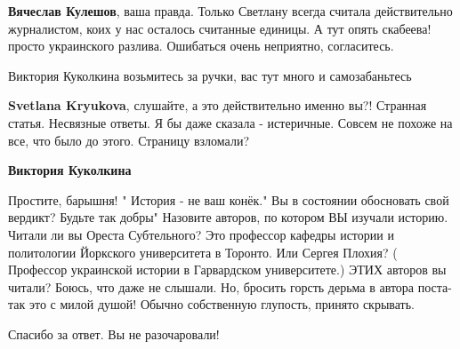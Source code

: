 \begin{itemize}
\begin{itemize}
\textbf{Вячеслав Кулешов}, ваша правда. Только Светлану всегда считала действительно журналистом, коих у нас осталось считанные единицы. А тут опять скабеева! просто украинского разлива. Ошибаться очень неприятно, согласитесь.


 
Виктория Куколкина возьмитесь за ручки, вас тут много и самозабаньтесь

 
\textbf{Svetlana Kryukova}, слушайте, а это действительно именно вы?! Странная статья. Несвязные ответы. Я бы даже сказала - истеричные. Совсем не похоже на все, что было до этого. Страницу взломали?

 
\textbf{Виктория Куколкина}

Простите, барышня! " История - не ваш конёк." Вы в состоянии обосновать свой
вердикт? Будьте так добры" Назовите авторов, по котором ВЫ изучали историю.
Читали ли вы Ореста Субтельного? Это профессор кафедры истории и политологии
Йоркского университета в Торонто. Или Сергея Плохия? ( Профессор украинской
истории в Гарвардском университете.) ЭТИХ авторов вы читали? Боюсь, что даже не
слышали. Но, бросить горсть дерьма в автора поста-так это с милой душой! Обычно
собственную глупость, принято скрывать.


 
Спасибо за ответ. Вы не разочаровали!

 

\end{itemize}
\end{itemize}
